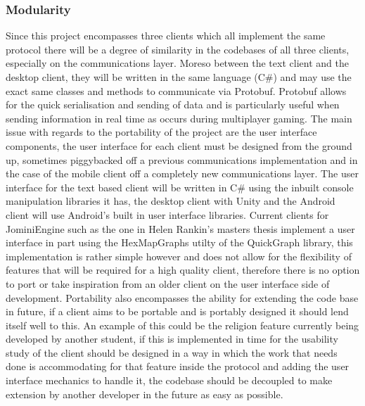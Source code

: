 \documentclass{article}
\begin{document}
    \subsubsection{Modularity}
    Since this project encompasses three clients which all implement the same protocol there will be a degree of similarity in the codebases of all three clients, especially on the communications layer. Moreso between the text client and the desktop client, they will be written in the same language (C\#) and may use the exact same classes and methods to communicate via Protobuf\cite{Protobuf}. Protobuf allows for the quick serialisation and sending of data and is particularly useful when sending information in real time as occurs during multiplayer gaming. The main issue with regards to the portability of the project are the user interface components, the user interface for each client must be designed from the ground up, sometimes piggybacked off a previous communications implementation and in the case of the mobile client off a completely new communications layer. The user interface for the text based client will be written in C\# using the inbuilt console manipulation libraries it has\cite{ConsoleClass}, the desktop client with Unity\cite{Unity3D} and the Android client will use Android's built in user interface libraries\cite{AndroidUI}. Current clients for JominiEngine such as the one in Helen Rankin's masters thesis\cite{helenrankin} implement a user interface in part using the HexMapGraphs utilty of the QuickGraph library\cite{QuickGraph}, this implementation is rather simple however and does not allow for the flexibility of features that will be required for a high quality client, therefore there is no option to port or take inspiration from an older client on the user interface side of development. Portability also encompasses the ability for extending the code base in future, if a client aims to be portable and is portably designed it should lend itself well to this. An example of this could be the religion feature currently being developed by another student, if this is implemented in time for the usability study of the client should be designed in a way in which the work that needs done is accommodating for that feature inside the protocol and adding the user interface mechanics to handle it, the codebase should be decoupled to make extension by another developer in the future as easy as possible. 
\end{document}
